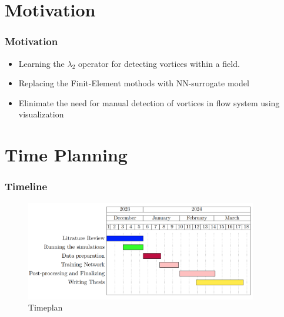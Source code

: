 \documentclass[aspectratio=169]{beamer}
\begin{document}

\section{Motivation}
\begin{frame}
  \frametitle{Motivation}
  \begin{itemize}
    \item Learning the $\lambda_{2}$ operator for detecting vortices within a field.
    \item Replacing the Finit-Element mothods with NN-surrogate model
    \item Elinimate the need for manual detection of vortices in flow system using visualization 
  \end{itemize}
\end{frame}


\section{Time Planning}
\begin{frame}
  \frametitle{Timeline}
  \begin{center}
    \begin{figure}
      \includegraphics[width=0.9\textwidth]{figs/Timeplan.png}
      \caption{Timeplan}
    \end{figure}
  \end{center} 
\end{frame}

\begin{frame}
  \begin{minipage}{0.1\textwidth}
    \hfill
  \end{minipage}
  \begin{minipage}{0.89\textwidth}
    \\
  \end{minipage}
  
\end{frame}


\end{document}
